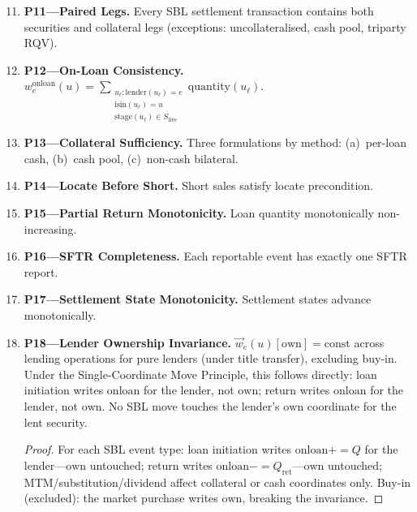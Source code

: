 \documentclass[11pt,a4paper]{article}
\begin{document}
\begin{enumerate}\setcounter{enumi}{10}
\item \textbf{P11---Paired Legs.} Every SBL settlement transaction contains both securities and collateral legs (exceptions: uncollateralised, cash pool, triparty RQV).

\item \textbf{P12---On-Loan Consistency.}
$w^{\mathrm{onloan}}_e(u) = \sum_{\substack{u_\ell : \mathrm{lender}(u_\ell) = e \\ \mathrm{isin}(u_\ell) = u \\ \mathrm{stage}(u_\ell) \in S_{\mathrm{live}}}} \mathrm{quantity}(u_\ell)$.

\item \textbf{P13---Collateral Sufficiency.} Three formulations by method: (a)~per-loan cash, (b)~cash pool, (c)~non-cash bilateral.

\item \textbf{P14---Locate Before Short.} Short sales satisfy locate precondition.

\item \textbf{P15---Partial Return Monotonicity.} Loan quantity monotonically non-increasing.

\item \textbf{P16---SFTR Completeness.} Each reportable event has exactly one SFTR report.

\item \textbf{P17---Settlement State Monotonicity.} Settlement states advance monotonically.

\item \textbf{P18---Lender Ownership Invariance.} $\vec{w}_e(u)[\mathrm{own}] = \mathrm{const}$ across lending operations for pure lenders (under title transfer), excluding buy-in. Under the Single-Coordinate Move Principle, this follows directly: loan initiation writes $\mathrm{onloan}$ for the lender, not $\mathrm{own}$; return writes $\mathrm{onloan}$ for the lender, not $\mathrm{own}$. No SBL move touches the lender's $\mathrm{own}$ coordinate for the lent security.

\begin{proof}
For each SBL event type: loan initiation writes $\mathrm{onloan} \mathrel{{+}{=}} Q$ for the lender---$\mathrm{own}$ untouched; return writes $\mathrm{onloan} \mathrel{{-}{=}} Q_{\mathrm{ret}}$---$\mathrm{own}$ untouched; MTM/substitution/dividend affect collateral or cash coordinates only. Buy-in (excluded): the market purchase writes $\mathrm{own}$, breaking the invariance.
\end{proof}


\end{enumerate}
\end{document}
